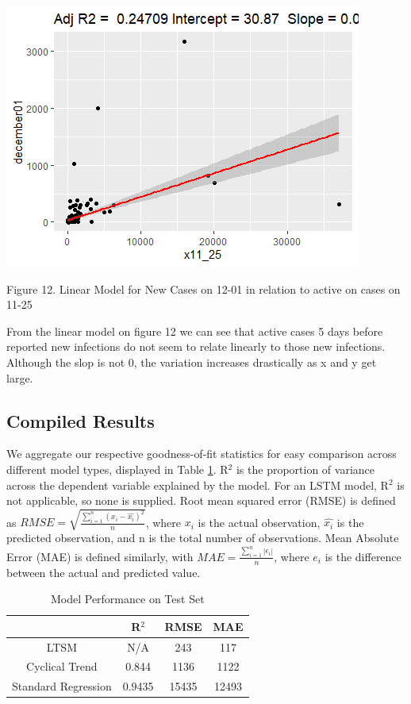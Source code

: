 \documentclass{article}
\begin{document}
\includegraphics{Rplot01.png}
\caption{Figure 12. Linear Model for New Cases on 12-01 in relation to active on cases on 11-25}

From the linear model on figure 12 we can see that active cases 5 days before reported new infections do not seem to relate linearly to those new infections. Although the slop is not 0, the variation increases drastically as x and y get large. 

\subsection{Compiled Results}
We aggregate our respective goodness-of-fit statistics for easy comparison across different model types, displayed in Table \ref{model_stats}. R$^2$ is the proportion of variance across the dependent variable explained by the model. For an LSTM model, R$^2$ is not applicable, so none is supplied. Root mean squared error (RMSE) is defined as $RMSE = \sqrt{\frac{\sum_{i=1}^n(x_i - \hat{x_i})^2}{n}}$, where $x_i$ is the actual observation, $\hat{x_i}$ is the predicted observation, and n is the total number of observations. Mean Absolute Error (MAE) is defined similarly, with $MAE = \frac{\sum_{i=1}^n|\epsilon_i|}{n}$, where $e_i$ is the difference between the actual and predicted value.

\begin{table}[H]
    \centering
    \begin{tabular}{c|ccc}
         &R$^2$&RMSE&MAE  \\\hline
         LTSM & N/A & 243 & 117\\
         Cyclical Trend&0.844&1136&1122\\
         Standard Regression&0.9435&15435&12493
    \end{tabular}
    \caption{Model Performance on Test Set}
    \label{model_stats}
\end{table}
\end{document}
